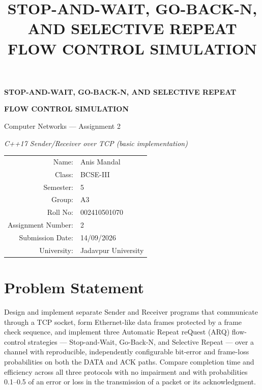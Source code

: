 \documentclass[11pt]{article}
\title{\textbf{STOP-AND-WAIT, GO-BACK-N, AND SELECTIVE REPEAT\\FLOW CONTROL SIMULATION}}
\date{}
\begin{document}
\begin{titlepage}
    \centering
    \vspace*{2cm}
    {\LARGE \textbf{STOP-AND-WAIT, GO-BACK-N, AND SELECTIVE REPEAT}\par}
    {\LARGE \textbf{FLOW CONTROL SIMULATION}\par}
    \vspace{0.5cm}
    {\large Computer Networks --- Assignment 2\par}
    {\itshape C++17 Sender/Receiver over TCP (basic implementation)\par}
    \vspace{3cm}

    \begin{tabular}{rl}
        Name:              & Anis Mandal         \\
        Class:             & BCSE-III            \\
        Semester:          & 5                   \\
        Group:             & A3                  \\
        Roll No:           & 002410501070        \\
        Assignment Number: & 2                   \\
        Submission Date:   & 14/09/2026          \\
        University:        & Jadavpur University \\
    \end{tabular}

\end{titlepage}

\tableofcontents
\newpage



\section*{Problem Statement}
Design and implement separate Sender and Receiver programs that communicate through a TCP
socket, form Ethernet-like data frames protected by a frame check sequence, and implement three
Automatic Repeat reQuest (ARQ) flow-control strategies --- Stop-and-Wait, Go-Back-N, and
Selective Repeat --- over a channel with reproducible, independently configurable bit-error and
frame-loss probabilities on both the DATA and ACK paths. Compare completion time and efficiency
across all three protocols with no impairment and with probabilities 0.1--0.5 of an error or loss in
the transmission of a packet or its acknowledgment.
\end{document}
